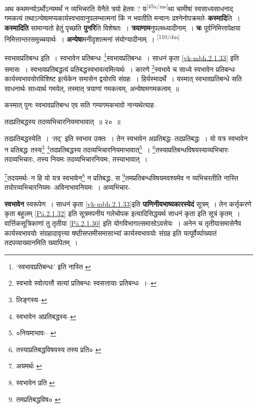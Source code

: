 \documentclass[article,12pt,a4paper]{memoir}
\begin{document}
	  \pstart अथ कथमन्योऽर्थोऽन्यमर्थं न व्यभिचरति येनैते त्रयो हेतवः ? य\leavevmode\textsuperscript{\rmlatinfont\tiny [45a/ms]}था चामीषां स्वसाध्यसाधनाद् गमकत्वं तथाऽन्येषामप्यकार्यस्वभावानुपलम्भात्मनां किं न भवतीति मन्वानः प्रश्नेनोपक्रमते--\textbf{कस्मादि}ति । \textbf{कस्मादिति} सामान्यतो हेतुं पृच्छति \textbf{पुनरि}ति विशेषतः । \textbf{त्रयाणाम}नुपलब्ध्यादीनाम् । \textbf{चः} पूर्वनिमित्तापेक्षया निमित्तान्तरसमुच्चयार्थः । \textbf{अन्येषा}मनीदृशात्मनां संयोग्यादीनाम् ।
	\pend
      \leavevmode\textsuperscript{\rmlatinfont\tiny [110/dm]}

	  \pstart स्वभावप्रतिबन्ध इति । स्वभावेन प्रतिबन्धः \footnote{‘स्वभावप्रतिबन्धः’ इति नास्ति \cite{dp-msC}}स्वभावप्रतिबन्धः । साधनं कृता \cref{vk-mbh.2.1.33} इति समासः । स्वभावप्रतिबद्धत्वं प्रतिबद्धस्वभावत्वमित्यर्थः । कारणे \footnote{स्वभावे स्वोत्पत्तौ सत्यां प्रतिबन्धः स्वसत्तायाः प्रतिबन्धः ।--\cite{dp-msD-n}}स्वभावे च साध्ये स्वभावेन प्रतिबन्धः कार्यस्वभावयोरविशिष्ट इत्येकेन समासेन द्वयोरपि संग्रहः । हिर्यस्मादर्थे । यस्मात् स्वभावप्रतिबन्धे सति साधनार्थः साध्यार्थ गमयेत्, तस्मात् त्रयाणां गमकत्वम्, अन्येषामगमकत्वम् ॥
	\pend
       

	  \pstart कस्मात् पुनः स्वभावप्रतिबन्ध एव सति गम्यगमकभावो नान्यथेत्याह--
	\pend
       

	  \pstart तदप्रतिबद्धस्य तदव्यभिचारनियमाभावात् ॥ २० ॥
	\pend
       

	  \pstart तदप्रतिबद्धस्येति । ‘तद्’ इति स्वभाव उक्तः । तेन स्वभावेन अप्रतिबद्धः--तदप्रतिबद्धः । यो यत्र स्वभावेन न प्रतिबद्धः तस्य\footnote{लिङ्गस्य--\cite{dp-msD-n}} \footnote{स्वभावेन अप्रतिबद्धस्य--\cite{dp-msD-n}}तदप्रतिबद्धस्य तदव्यभिचारनियमाभावात्\footnote{०नियमाभावः--\cite{dp-msA} \cite{dp-edP} \cite{dp-edH} \cite{dp-edE}} । \footnote{तस्याप्रतिबद्धविषयस्य \cite{dp-msA} \cite{dp-edP} \cite{dp-edH} तस्य प्रति० \cite{dp-edN}}तस्याप्रतिबन्धविषयस्याव्यभिचारः तदव्यभिचारः, तस्य नियमः तदव्यभिचारनियमः, तस्याभावात् ।
	\pend
       

	  \pstart \footnote{अयमर्थः \cite{dp-msA} \cite{dp-msB} \cite{dp-msC} \cite{dp-msD} \cite{dp-edP} \cite{dp-edH} \cite{dp-edE} \cite{dp-edN}}तदयमर्थः--न हि यो यत्र स्वभावेन\footnote{स्वभावेन प्रति \cite{dp-msB}} न प्रतिबद्धः, स \footnote{तमप्रतिबद्धविष० \cite{dp-msA} \cite{dp-edP} \cite{dp-edH}}तमप्रतिबन्धविषयमवश्यमेव न व्यभिचरतीति नास्ति तयोरव्यभिचारनियमः--अविनाभावनियमः । अव्यभिचार-
	\pend
      

	  \pstart \textbf{स्वभावेन} स्वरूपेण । साधनं कृता \cref{vk-mbh.2.1.33}इति \textbf{पाणिनीयभाष्यकारस्येदं} सूत्रम् । तेन कर्त्तृकरणे कृता बहुलम् \cref{Pā.2.1.32} इति सूत्रमपनीय गलेचोपक इत्यादिसिद्ध्यर्थ साधनं कृता इति सूत्रं कृतम् । वार्त्तिकसूत्रिकाणां तु तृतीया \cref{Pā.2.1.30} इति योगविभागात्समासोऽवसेयः । अनेन च तृतीयासमासेनैव कार्यस्वभावयोः संग्रहादावृत्त्या षष्ठीसप्तमीसमासाभ्यां कार्यस्वभावयोः संग्रह इति यत्पूर्वैर्व्याख्यातं तदपव्याख्यानमिति ख्यापितम् ।
	\pend
      
\end{document}
